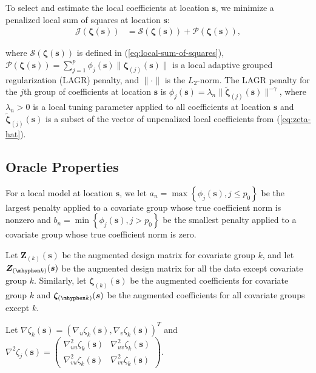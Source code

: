 \documentclass[authoryear,review, 12pt]{elsarticle}
\begin{document}
To select and estimate the local coefficients at location $\bm{s}$,
we minimize a penalized local sum of squares at location $\bm{s}$:
\begin{align*}
\mathcal{J}\left(\bm{\zeta}(\bm{s})\right) & =\mathcal{S}\left(\bm{\zeta}(\bm{s})\right)+\mathcal{P}\left(\bm{\zeta}(\bm{s})\right),
\end{align*}


where $\mathcal{S}\left(\bm{\zeta}\left(\bm{s}\right)\right)$ is
defined in (\ref{eq:local-sum-of-squares}), $\mathcal{P}\left(\bm{\zeta}(\bm{s})\right)=\sum_{j=1}^{p}\phi_{j}(\bm{s})\|\bm{\zeta}_{(j)}(\bm{s})\|$
is a local adaptive grouped regularization (LAGR) penalty, and $\|\cdot\|$
is the $L_{2}$-norm. The LAGR penalty for the $j$th group of coefficients
at location $\bm{s}$ is $\phi_{j}(\bm{s})=\lambda_{n}\|\tilde{\bm{\zeta}}_{(j)}(\bm{s})\|^{-\gamma}$,
where $\lambda_{n}>0$ is a local tuning parameter applied to all
coefficients at location $\bm{s}$ and $\tilde{\bm{\zeta}}_{(j)}(\bm{s})$
is a subset of the vector of unpenalized local coefficients from (\ref{eq:zeta-hat}).


\subsection{Oracle Properties\label{sub:oracle-properties}}

For a local model at location $\bm{s}$, we let $a_{n}=\max\left\{ \phi_{j}(\bm{s}),j\le p_{0}\right\} $
be the largest penalty applied to a covariate group whose true coefficient
norm is nonzero and $b_{n}=\min\left\{ \phi_{j}(\bm{s}),j>p_{0}\right\} $
be the smallest penalty applied to a covariate group whose true coefficient
norm is zero.

Let $\bm{Z}_{(k)}(\bm{s})$ be the augmented design matrix for covariate
group $k$, and let $\bm{Z}_{(\mhyphen k)}(\bm{s})$ be the augmented
design matrix for all the data except covariate group $k$. Similarly,
let $\bm{\zeta}_{(k)}(\bm{s})$ be the augmented coefficients for
covariate group $k$ and $\bm{\zeta}_{(\mhyphen k)}(\bm{s})$ be the
augmented coefficients for all covariate groups except $k$.

Let $\nabla\zeta_{k}(\bm{s})=\left(\nabla_{u}\zeta_{k}(\bm{s}),\nabla_{v}\zeta_{k}(\bm{s})\right)^{T}$
and $\nabla^{2}\zeta_{j}(\bm{s})=\left(\begin{array}{cc}
\nabla_{uu}^{2}\zeta_{k}(\bm{s}) & \nabla_{uv}^{2}\zeta_{k}(\bm{s})\\
\nabla_{vu}^{2}\zeta_{k}(\bm{s}) & \nabla_{vv}^{2}\zeta_{k}(\bm{s})
\end{array}\right)$.
\end{document}
